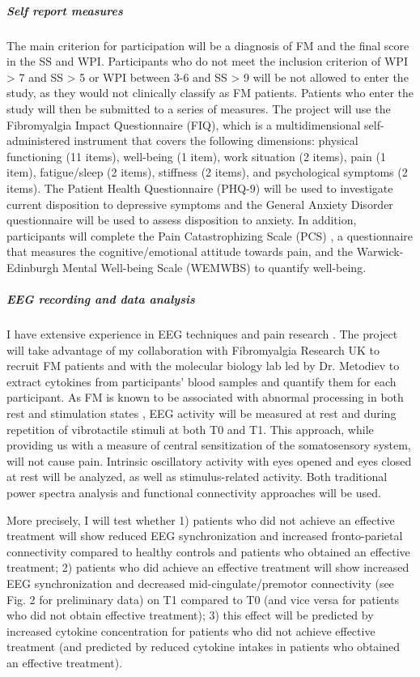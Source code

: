 \documentclass[twocolumn, serif, rga, numeric]{jote-article}
\begin{document}
\subparagraph{Self report measures}


The main criterion for participation will be a diagnosis of FM and the
final score in the SS and WPI. Participants who do not meet the
inclusion criterion of WPI \textgreater{} 7 and SS \textgreater{} 5 or
WPI between 3-6 and SS \textgreater{} 9 will be not allowed to enter the
study, as they would not clinically classify as FM patients. Patients
who enter the study will then be submitted to a series of measures. The
project will use the Fibromyalgia Impact Questionnaire (FIQ), which is a
multidimensional self-administered instrument that covers the following
dimensions: physical functioning (11 items), well-being (1 item), work
situation (2 items), pain (1 item), fatigue/sleep (2 items), stiffness
(2 items), and psychological symptoms (2 items). The Patient Health
Questionnaire (PHQ-9) will be used to investigate current disposition to
depressive symptoms \cite{Kroenke2002} and the General Anxiety Disorder
questionnaire \cite{Spitzer2006} will be used to assess disposition to
anxiety. In addition, participants will complete the Pain
Catastrophizing Scale (PCS) \cite{Sullivan1995}, a questionnaire that
measures the cognitive/emotional attitude towards pain, and the
Warwick-Edinburgh Mental Well-being Scale (WEMWBS) \cite{Tennant2007}
to quantify well-being.


\subparagraph{EEG recording and data analysis}

I have extensive experience in EEG techniques and pain
research \cite{Legrain2012,Torta2017}. The project will take advantage of my
collaboration with Fibromyalgia Research UK to recruit FM patients and
with the molecular biology lab led by Dr. Metodiev to extract cytokines
from participants' blood samples and quantify them for each participant.
As FM is known to be associated with abnormal processing in both rest
and stimulation states \cite{Sluka2016}, EEG activity will be measured
at rest and during repetition of vibrotactile stimuli at both T0 and T1.
This approach, while providing us with a measure of central
sensitization of the somatosensory system, will not cause pain.
Intrinsic oscillatory activity with eyes opened and eyes closed at rest
will be analyzed, as well as stimulus-related activity. Both traditional
power spectra analysis and functional connectivity approaches will be
used.

More precisely, I will test whether 1) patients who did not achieve an
effective treatment will show reduced EEG synchronization and increased
fronto-parietal connectivity compared to healthy controls and patients
who obtained an effective treatment; 2) patients who did achieve an
effective treatment will show increased EEG synchronization and
decreased mid-cingulate/premotor connectivity (see Fig. 2 for
preliminary data) on T1 compared to T0 (and vice versa for patients who
did not obtain effective treatment); 3) this effect will be predicted by
increased cytokine concentration for patients who did not achieve
effective treatment (and predicted by reduced cytokine intakes in
patients who obtained an effective treatment).
\end{document}
